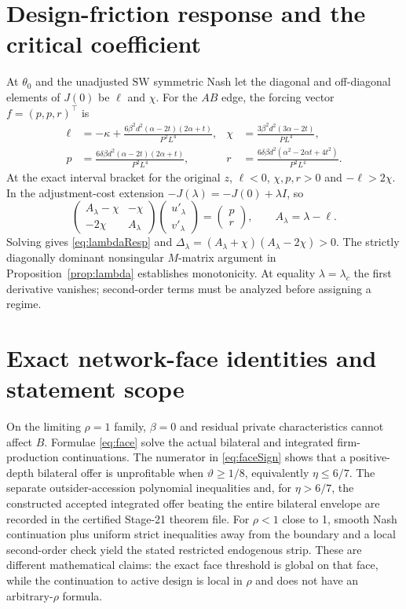 \documentclass[11pt,a4paper]{article}
\theoremstyle{remark}\newtheorem{remark}[theorem]{Remark}
\newcommand{\SW}{\mathrm{SW}}\newcommand{\SU}{\mathrm{SU}}\newcommand{\IS}{\mathrm{IS}}
\begin{document}
\section{Design-friction response and the critical coefficient}\label{app:lambda}
At $\theta_0$ and the unadjusted $\SW$ symmetric Nash let the diagonal and off-diagonal elements of $J(0)$ be $\ell$ and $\chi$. For the $AB$ edge, the forcing vector $f=(p,p,r)^{\top}$ is
\begin{align}
\ell&=-\kappa+\frac{6\beta^2d^2(\alpha-2t)(2\alpha+t)}{P^2L^4},
&\chi&=\frac{3\beta^2d^2(3\alpha-2t)}{PL^4},\\
p&=\frac{6\delta\beta d^2(\alpha-2t)(2\alpha+t)}{P^2L^4},
&r&=\frac{6\delta\beta d^2(\alpha^2-2\alpha t+4t^2)}{P^2L^4}.
\end{align}
At the exact interval bracket for the original $z$, $\ell<0$, $\chi,p,r>0$ and $-\ell>2\chi$. In the adjustment-cost extension $-J(\lambda)=-J(0)+\lambda I$, so
\[
\begin{pmatrix} A_\lambda-\chi &-\chi\\ -2\chi&A_\lambda\end{pmatrix}
\begin{pmatrix}u'_\lambda\\v'_\lambda\end{pmatrix}=
\begin{pmatrix}p\\r\end{pmatrix},\qquad A_\lambda=\lambda-\ell.
\]
Solving gives \eqref{eq:lambdaResp} and $\Delta_\lambda=(A_\lambda+\chi)(A_\lambda-2\chi)>0$. The strictly diagonally dominant nonsingular $M$-matrix argument in Proposition~\ref{prop:lambda} establishes monotonicity. At equality $\lambda=\lambda_c$ the first derivative vanishes; second-order terms must be analyzed before assigning a regime.

\section{Exact network-face identities and statement scope}\label{app:network}
On the limiting $\rho=1$ family, $\beta=0$ and residual private characteristics cannot affect $B$. Formulae \eqref{eq:face} solve the actual bilateral and integrated firm-production continuations. The numerator in \eqref{eq:faceSign} shows that a positive-depth bilateral offer is unprofitable when $\vartheta\ge1/8$, equivalently $\eta\le6/7$. The separate outsider-accession polynomial inequalities and, for $\eta>6/7$, the constructed accepted integrated offer beating the entire bilateral envelope are recorded in the certified Stage-21 theorem file. For $\rho<1$ close to 1, smooth Nash continuation plus uniform strict inequalities away from the boundary and a local second-order check yield the stated restricted endogenous strip. These are different mathematical claims: the exact face threshold is global on that face, while the continuation to active design is local in $\rho$ and does not have an arbitrary-$\rho$ formula.
\end{document}
